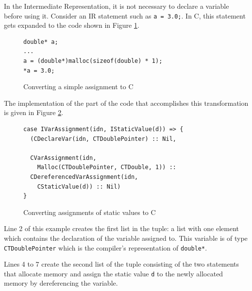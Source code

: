 \documentclass[11pt]{report}
\begin{document}
In the Intermediate Representation, it is not necessary to declare a variable before using it. Consider an IR statement such as \texttt{a = 3.0;}. In C, this statement gets expanded to the code shown in Figure \ref{iconvc1}.
\begin{figure}[ht]
\begin{lstlisting}
double* a;
...
a = (double*)malloc(sizeof(double) * 1);
*a = 3.0;
\end{lstlisting}
\caption{Converting a simple assignment to C}
\label{iconvc1}
\end{figure}

The implementation of the part of the code that accomplishes this transformation is given in Figure \ref{iconvc2}.

\begin{figure}[ht]
\begin{lstlisting}
case IVarAssignment(idn, IStaticValue(d)) => {
  (CDeclareVar(idn, CTDoublePointer) :: Nil,
  
  CVarAssignment(idn, 
    Malloc(CTDoublePointer, CTDouble, 1)) ::
  CDereferencedVarAssignment(idn, 
    CStaticValue(d)) :: Nil)
}
\end{lstlisting}
\caption{Converting assignments of static values to C}
\label{iconvc2}
\end{figure}

Line 2 of this example creates the first list in the tuple: a list with one element which contains the declaration of the variable assigned to. This variable is of type \texttt{CTDoublePointer} which is the compiler's representation of \texttt{double*}.

Lines 4 to 7 create the second list of the tuple consisting of the two statements that allocate memory and assign the static value \texttt{d} to the newly allocated memory by dereferencing the variable.
\end{document}

